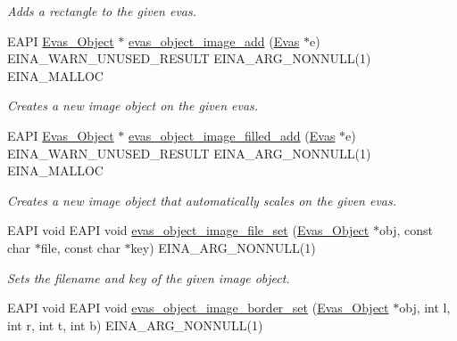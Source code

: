 \begin{DoxyCompactItemize}
\begin{DoxyCompactList}\small\item\em Adds a rectangle to the given evas. \item\end{DoxyCompactList}\item 
EAPI \hyperlink{group__Evas__Object__Group_ga9e19e6dd1f517a0ba437c0114d3e7c97}{Evas\_\-Object} $\ast$ \hyperlink{group__Evas__Object__Image_gae2bf7d73874a8b11ac4d7cb3bf2476ce}{evas\_\-object\_\-image\_\-add} (\hyperlink{group__Evas__Canvas_ga5ff87cc4ce6bc43e3b640a6d37f73043}{Evas} $\ast$e) EINA\_\-WARN\_\-UNUSED\_\-RESULT EINA\_\-ARG\_\-NONNULL(1) EINA\_\-MALLOC
\begin{DoxyCompactList}\small\item\em Creates a new image object on the given evas. \item\end{DoxyCompactList}\item 
EAPI \hyperlink{group__Evas__Object__Group_ga9e19e6dd1f517a0ba437c0114d3e7c97}{Evas\_\-Object} $\ast$ \hyperlink{group__Evas__Object__Image_ga2e4275b1aee95e338ffa8b39e81f4eee}{evas\_\-object\_\-image\_\-filled\_\-add} (\hyperlink{group__Evas__Canvas_ga5ff87cc4ce6bc43e3b640a6d37f73043}{Evas} $\ast$e) EINA\_\-WARN\_\-UNUSED\_\-RESULT EINA\_\-ARG\_\-NONNULL(1) EINA\_\-MALLOC
\begin{DoxyCompactList}\small\item\em Creates a new image object that automatically scales on the given evas. \item\end{DoxyCompactList}\item 
EAPI void EAPI void \hyperlink{group__Evas__Object__Image_ga70f63c055b2e248089e761f5c0f78a0f}{evas\_\-object\_\-image\_\-file\_\-set} (\hyperlink{group__Evas__Object__Group_ga9e19e6dd1f517a0ba437c0114d3e7c97}{Evas\_\-Object} $\ast$obj, const char $\ast$file, const char $\ast$key) EINA\_\-ARG\_\-NONNULL(1)
\begin{DoxyCompactList}\small\item\em Sets the filename and key of the given image object. \item\end{DoxyCompactList}\item 
EAPI void EAPI void \hyperlink{group__Evas__Object__Image_ga6283aace5be077433bee45ec23ad072d}{evas\_\-object\_\-image\_\-border\_\-set} (\hyperlink{group__Evas__Object__Group_ga9e19e6dd1f517a0ba437c0114d3e7c97}{Evas\_\-Object} $\ast$obj, int l, int r, int t, int b) EINA\_\-ARG\_\-NONNULL(1)

\end{DoxyCompactItemize}

